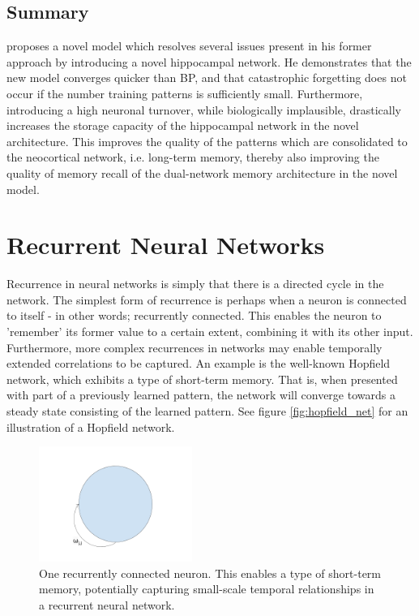 \subsection{Summary}
\cite{Hattori2014} proposes a novel model which resolves several issues present in his former approach by introducing a novel hippocampal network. He demonstrates that the new model converges quicker than BP, and that catastrophic forgetting does not occur if the number training patterns is sufficiently small. Furthermore, introducing a high neuronal turnover, while biologically implausible, drastically increases the storage capacity of the hippocampal network in the novel architecture. This improves the quality of the patterns which are consolidated to the neocortical network, i.e. long-term memory, thereby also improving the quality of memory recall of the dual-network memory architecture in the novel model.


\section{Recurrent Neural Networks}

Recurrence in neural networks is simply that there is a directed cycle in the network. The simplest form of recurrence is perhaps when a neuron is connected to itself - in other words; recurrently connected. This enables the neuron to 'remember' its former value to a certain extent, combining it with its other input. Furthermore, more complex recurrences in networks may enable temporally extended correlations to be captured. An example is the well-known Hopfield network, which exhibits a type of short-term memory. That is, when presented with part of a previously learned pattern, the network will converge towards a steady state consisting of the learned pattern. See figure \ref{fig:hopfield_net} for an illustration of a Hopfield network.

\begin{figure}
\centering
\includegraphics[width=5cm]{fig/one_recurrent_neuron}
\caption{One recurrently connected neuron. This enables a type of short-term memory, potentially capturing small-scale temporal relationships in a recurrent neural network.}
\label{fig:one_recurrent_neuron}
\end{figure}

